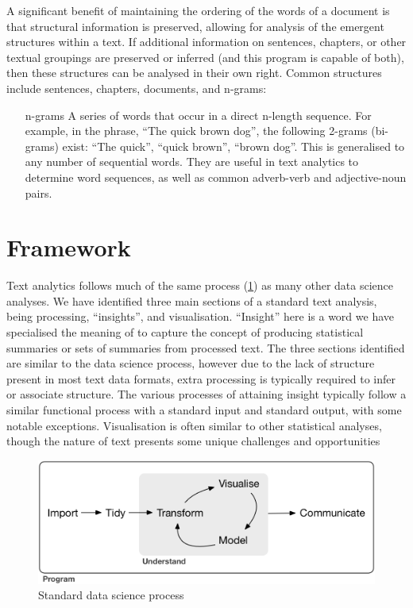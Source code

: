 \documentclass[11pt, a4paper, titlepage]{report}
\begin{document}
A significant benefit of maintaining the ordering of the words of a
document is that structural information is preserved, allowing for
analysis of the emergent structures within a text. If additional
information on sentences, chapters, or other textual groupings are
preserved or inferred (and this program is capable of both), then
these structures can be analysed in their own right. Common structures
include sentences, chapters, documents, and n-grams:

\begin{itemize}
\item[\gls{n-grams}] A series of words that occur in a direct n-length
  sequence. For example, in the phrase, ``The quick brown dog'', the
  following 2-grams (bi-grams) exist: ``The quick'', ``quick brown'',
  ``brown dog''. This is generalised to any number of sequential
  words. They are useful in text analytics to determine word
  sequences, as well as common adverb-verb and adjective-noun pairs.
\end{itemize}

\section{Framework}\label{sec:framework-used}

Text analytics follows much of the same process
(\underline{\cref{fig:std-ds}}) as many other data science analyses.
We have identified three main sections of a standard text analysis,
being processing, ``insights'', and visualisation. ``Insight'' here is
a word we have specialised the meaning of to capture the concept of
producing statistical summaries or sets of summaries from processed
text. The three sections identified are similar to the data science
process, however due to the lack of structure present in most text
data formats, extra processing is typically required to infer or
associate structure. The various processes of attaining insight
typically follow a similar functional process with a standard input
and standard output, with some notable exceptions. Visualisation is
often similar to other statistical analyses, though the nature of text
presents some unique challenges and opportunities

\begin{figure}[h]
  \centering \includegraphics[scale=0.8]{std-ds.png}
  \caption{Standard data science
    process\autocite{wickham2016r}\label{fig:std-ds}}
\end{figure}
\end{document}
